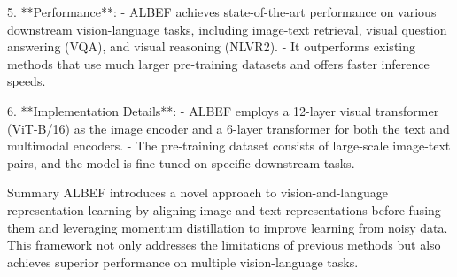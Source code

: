 5. **Performance**:
   - ALBEF achieves state-of-the-art performance on various downstream vision-language tasks, including image-text retrieval, visual question answering (VQA), and visual reasoning (NLVR2).
   - It outperforms existing methods that use much larger pre-training datasets and offers faster inference speeds.

6. **Implementation Details**:
   - ALBEF employs a 12-layer visual transformer (ViT-B/16) as the image encoder and a 6-layer transformer for both the text and multimodal encoders.
   - The pre-training dataset consists of large-scale image-text pairs, and the model is fine-tuned on specific downstream tasks.

 Summary
ALBEF introduces a novel approach to vision-and-language representation learning by aligning image and text representations before fusing them and leveraging momentum distillation to improve learning from noisy data. This framework not only addresses the limitations of previous methods but also achieves superior performance on multiple vision-language tasks.